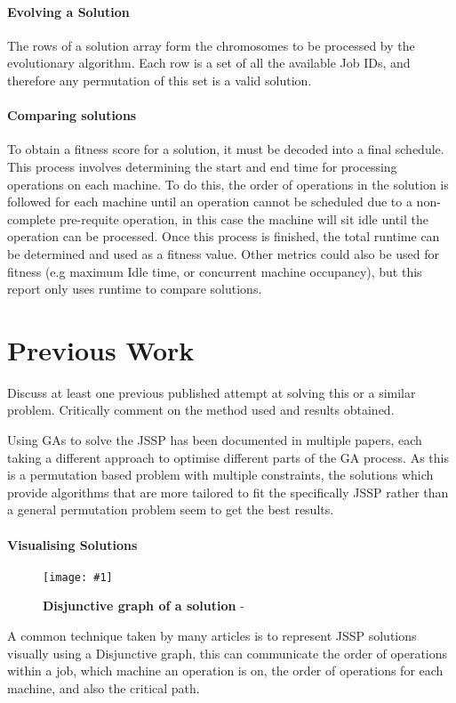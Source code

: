\documentclass[14pt]{acmsiggraph}
\newcommand{\figuremacroWH}[4]{
	\begin{figure}[h!] %
		\centering
		\texttt{[image: \#1]}
		\caption[#2]{\textbf{#2} - #3}
		\label{fig:#1}
	\end{figure}
}
\begin{document}
	\paragraph{Evolving a Solution}
	The rows of a solution array form the chromosomes to be processed by the evolutionary algorithm. Each row is a set of all the available Job IDs, and therefore any permutation of this set is a valid solution. 
	
	\paragraph{Comparing solutions}
	To obtain a fitness score for a solution, it must be decoded into a final schedule. This process involves determining the start and end time for processing operations on each machine. To do this, the order of operations in the solution is followed for each machine until an operation cannot be scheduled due to a non-complete pre-requite operation, in this case the machine will sit idle until the operation can be processed. Once this process is finished, the total runtime can be determined and used as a fitness value. Other metrics could also be used for fitness (e.g maximum Idle time, or concurrent machine occupancy), but this report only uses runtime to compare solutions.
	
	\section{Previous  Work}
	Discuss at least one previous published attempt at solving this or a similar problem. 
	Critically comment on the method used and results obtained.
	
	Using GAs to solve the JSSP has been documented in multiple papers, each taking a different approach to optimise different parts of the GA process. As this is a permutation based problem with multiple constraints, the solutions which provide algorithms that are more tailored to fit the specifically JSSP rather than a general permutation problem seem to get the best results.
	
	\paragraph{Visualising Solutions}
	\figuremacroWH
	{chart}
	{Disjunctive graph of a solution}
	{\cite{gao2011efficient}}
	{1.0}
	
	A common technique taken by many articles is to represent JSSP solutions visually using a Disjunctive graph, this can communicate the order of operations within a job, which machine an operation is on, the order of operations for each machine, and also the critical path.
	
\end{document}
